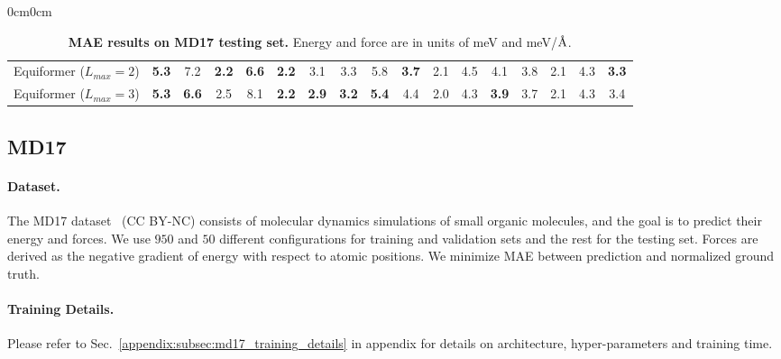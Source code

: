 \begin{table}[t]
\begin{adjustwidth}{0cm}{0cm}
{\begin{tabular}{lcccccccccccccccc}
\midrule[0.6pt]

Equiformer ($L_{max} = 2$)                                           & \textbf{5.3}          & 7.2          & \textbf{2.2}          & \textbf{6.6}          & \textbf{2.2}          & 3.1          & 3.3             & 5.8             & \textbf{3.7}            & 2.1           & 4.5              & 4.1             & 3.8          & 2.1          & 4.3          & \textbf{3.3}        \\
Equiformer ($L_{max} = 3$)                                           & \textbf{5.3}          & \textbf{6.6}          & 2.5          & 8.1          & \textbf{2.2}          & \textbf{2.9}          & \textbf{3.2}             & \textbf{5.4}             & 4.4            & 2.0           & 4.3              & \textbf{3.9}            & 3.7          & 2.1         & 4.3          & 3.4        \\
\bottomrule[1.2pt]
\end{tabular}
}
\end{adjustwidth}
\vspace{-3mm}
\caption{\textbf{MAE results on MD17 testing set.} Energy and force are in units of meV and meV/$\textup{\AA}$.}
\vspace{-5.5mm}
\label{tab:md17_result}
\end{table}

\vspace{-3mm}
\subsection{MD17}
\vspace{-3mm}
\label{subsec:md17}


\paragraph{Dataset.}
The MD17 dataset~\citep{md17_1, md17_2, md17_3} (CC BY-NC) consists of molecular dynamics simulations of small organic molecules, and the goal is to predict their energy and forces.
We use $950$ and $50$ different configurations for training and validation sets and the rest for the testing set.
Forces are derived as the negative gradient of energy with respect to atomic positions. 
We minimize MAE between prediction and normalized ground truth.

\vspace{-3.25mm}
\paragraph{Training Details.}
Please refer to Sec.~\ref{appendix:subsec:md17_training_details} in appendix for details on architecture, hyper-parameters and training time.



